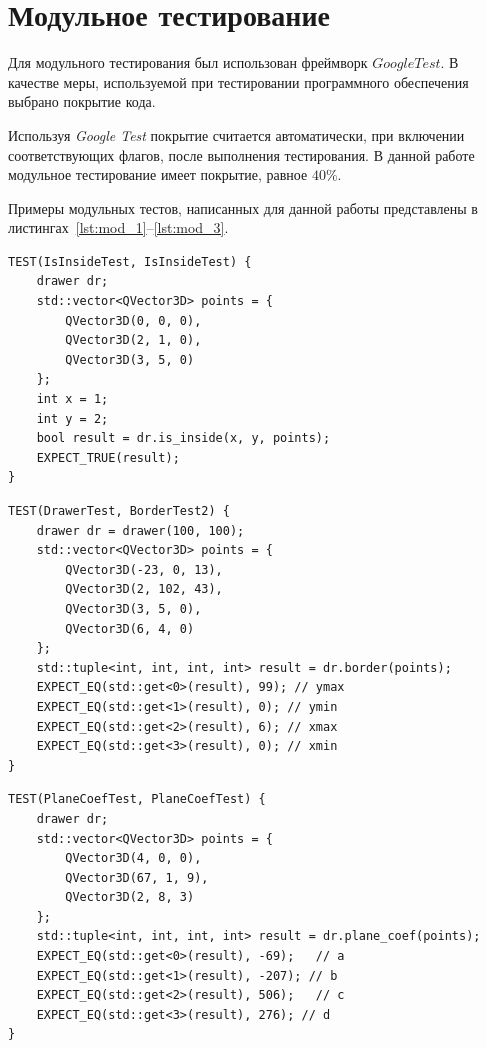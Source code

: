 \section{Модульное тестирование}

Для модульного тестирования был использован фреймворк \textit{$Google Test$}.
В качестве меры, используемой при тестировании программного обеспечения выбрано покрытие кода.

Используя \textit{Google Test} покрытие считается автоматически, при включении соответствующих флагов, после выполнения тестирования. В данной работе модульное тестирование имеет покрытие, равное $40\%$.

Примеры модульных тестов, написанных для данной работы представлены в листингах~\ref{lst:mod_1}--\ref{lst:mod_3}.
\clearpage
\begin{center}
	\captionsetup{justification=raggedright,singlelinecheck=off}
	\begin{lstlisting}[label=lst:mod_1,caption={Тест для функции, которая определяет принадлежность точки полигону}]
TEST(IsInsideTest, IsInsideTest) {
	drawer dr;
	std::vector<QVector3D> points = {
		QVector3D(0, 0, 0),
		QVector3D(2, 1, 0),
		QVector3D(3, 5, 0)
	};
	int x = 1;
	int y = 2;
	bool result = dr.is_inside(x, y, points);
	EXPECT_TRUE(result);
}
	\end{lstlisting}
\end{center}


\begin{center}
	\captionsetup{justification=raggedright,singlelinecheck=off}
	\begin{lstlisting}[label=lst:mod_2,caption={Тест для функции, которая определяет прямоугольник, в который вписан полигон}]
TEST(DrawerTest, BorderTest2) {
	drawer dr = drawer(100, 100);
	std::vector<QVector3D> points = {
		QVector3D(-23, 0, 13),
		QVector3D(2, 102, 43),
		QVector3D(3, 5, 0),
		QVector3D(6, 4, 0)
	};
	std::tuple<int, int, int, int> result = dr.border(points);
	EXPECT_EQ(std::get<0>(result), 99); // ymax
	EXPECT_EQ(std::get<1>(result), 0); // ymin
	EXPECT_EQ(std::get<2>(result), 6); // xmax
	EXPECT_EQ(std::get<3>(result), 0); // xmin
}
	\end{lstlisting}
\end{center}
\clearpage

\begin{center}
	\captionsetup{justification=raggedright,singlelinecheck=off}
	\begin{lstlisting}[label=lst:mod_3,caption={Тест для функции, которая вычисляет коэффициенты плоскости}]
TEST(PlaneCoefTest, PlaneCoefTest) {
	drawer dr;
	std::vector<QVector3D> points = {
		QVector3D(4, 0, 0),
		QVector3D(67, 1, 9),
		QVector3D(2, 8, 3)
	};
	std::tuple<int, int, int, int> result = dr.plane_coef(points);
	EXPECT_EQ(std::get<0>(result), -69);   // a
	EXPECT_EQ(std::get<1>(result), -207); // b
	EXPECT_EQ(std::get<2>(result), 506);   // c
	EXPECT_EQ(std::get<3>(result), 276); // d
}
	\end{lstlisting}
\end{center}


